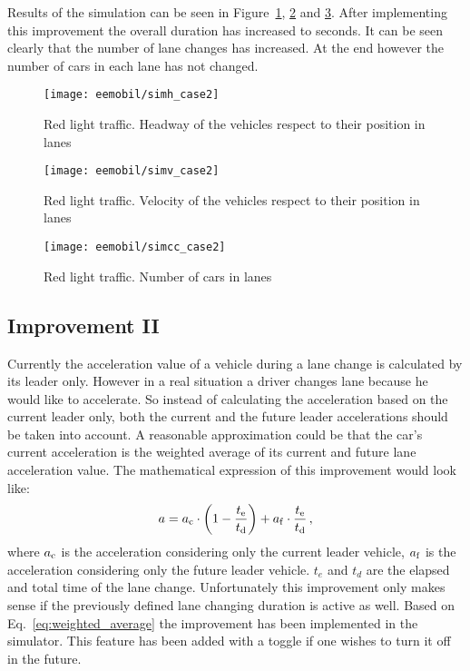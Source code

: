 		Results of the simulation can be seen in Figure~\ref{fig:red_light_situationh_impr1}, \ref{fig:red_light_situationv_impr1} and \ref{fig:red_light_situationcc_impr1}. After implementing this improvement the overall duration has increased to seconds. It can be seen clearly that the number of lane changes has increased. At the end however the number of cars in each lane has not changed.
		\begin{figure}
			\centering
			\texttt{[image: eemobil/simh\_case2]}
			\caption{Red light traffic. Headway of the vehicles respect to their position in lanes}
			\label{fig:red_light_situationh_impr1}
		\end{figure}
		\begin{figure}
			\centering
			\texttt{[image: eemobil/simv\_case2]}
			\caption{Red light traffic. Velocity of the vehicles respect to their position in lanes}
			\label{fig:red_light_situationv_impr1}
		\end{figure}
		\begin{figure}
			\centering
			\texttt{[image: eemobil/simcc\_case2]}
			\caption{Red light traffic. Number of cars in lanes }
			\label{fig:red_light_situationcc_impr1}
		\end{figure}
		\subsection{Improvement II}
		Currently the acceleration value of a vehicle during a lane change is calculated by its leader only. However in a real situation a driver changes lane because he would like to accelerate. So instead of calculating the acceleration based on the current leader only, both the current and the future leader accelerations should be taken into account. A reasonable approximation could be that the car's current acceleration is the weighted average of its current and future lane acceleration value. The mathematical expression of this improvement would look like:
		\begin{equation}
			a=a_{\rm c} \cdot \left(1-\frac{t_{\rm e}}{t_{\rm d}}\right) + a_{\rm f}\cdot \frac{t_{\rm e}}{t_{\rm d}}\,,
			\label{eq:weighted_average}
		\end{equation}
		where $a_{\rm c}$ is the acceleration considering only the current leader vehicle, $a_{\rm f}$ is the acceleration considering only the future leader vehicle. $t_e$ and $t_d$ are the elapsed and total time of the lane change. Unfortunately this improvement only makes sense if the previously defined lane changing duration is active as well. Based on Eq.~\eqref{eq:weighted_average} the improvement has been implemented in the simulator. This feature has been added with a toggle if one wishes to turn it off in the future.
		
